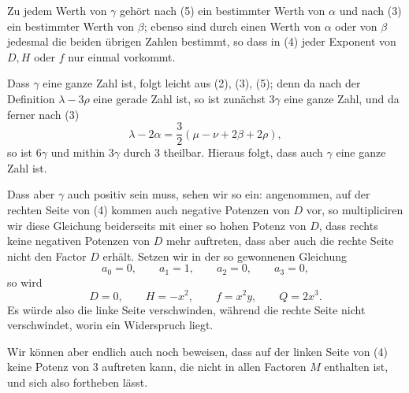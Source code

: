 \documentclass[11pt]{article}
\begin{document}
Zu jedem Werth von $\gamma$ gehört nach (5) ein bestimmter Werth von $\alpha$ und nach (3) ein bestimmter Werth von $\beta$; ebenso sind durch einen Werth von $\alpha$ oder von $\beta$ jedesmal die beiden übrigen Zahlen bestimmt, so dass in (4) jeder Exponent von $D,H$ oder $f$ nur einmal vorkommt.

Dass $\gamma$ eine ganze Zahl ist, folgt leicht aus (2), (3), (5); denn da nach der Definition $\lambda-3\rho$ eine gerade Zahl ist, so ist zunächst $3\gamma$ eine ganze Zahl, und da ferner nach (3)
\[
 \lambda-2\alpha=\frac32(\mu-\nu+2\beta+2\rho),
\]
so ist $6\gamma$ und mithin $3\gamma$ durch $3$ theilbar. Hieraus folgt, dass auch $\gamma$ eine ganze Zahl ist.

Dass aber $\gamma$ auch positiv sein muss, sehen wir so ein: angenommen, auf der rechten Seite von (4) kommen auch negative Potenzen von $D$ vor, so multipliciren wir diese Gleichung beiderseits mit einer so hohen Potenz von $D$, dass rechts keine negativen Potenzen von $D$ mehr auftreten, dass aber auch die rechte Seite nicht den Factor $D$ erhält. Setzen wir in der so gewonnenen Gleichung
\begin{equation}
 a_0=0,
 \qquad a_1=1,
 \qquad a_2=0,
 \qquad a_3=0,
\tag{6}
\end{equation}
so wird
\begin{equation}
 D=0,
 \qquad H=-x^2,
 \qquad f=x^2y,
 \qquad Q=2x^3.
\tag{7}
\end{equation}
Es würde also die linke Seite verschwinden, während die rechte Seite nicht verschwindet, worin ein Widerspruch liegt.

Wir können aber endlich auch noch beweisen, dass auf der linken Seite von (4) keine Potenz von $3$ auftreten kann, die nicht in allen Factoren $M$ enthalten ist, und sich also fortheben lässt.
\end{document}
